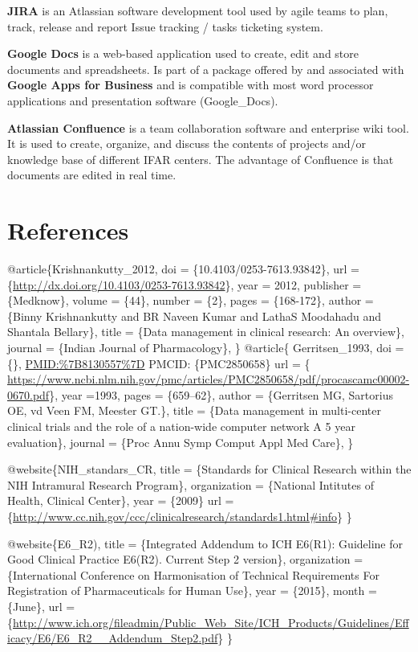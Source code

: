 \documentclass[]{book}
\theoremstyle{definition}
\theoremstyle{definition}
\theoremstyle{definition}
\theoremstyle{remark}
\begin{document}
\textbf{JIRA} is an Atlassian software development tool used by agile
teams to plan, track, release and report Issue tracking / tasks
ticketing system.

\textbf{Google Docs} is a web-based application used to create, edit and
store documents and spreadsheets. Is part of a package offered by and
associated with \textbf{Google Apps for Business} and is compatible with
most word processor applications and presentation software
(Google\_Docs).

\textbf{Atlassian Confluence} is a team collaboration software and
enterprise wiki tool. It is used to create, organize, and discuss the
contents of projects and/or knowledge base of different IFAR centers.
The advantage of Confluence is that documents are edited in real time.

\section{References}\label{references-1}

@article\{Krishnankutty\_2012, doi = \{10.4103/0253-7613.93842\}, url =
\{\url{http://dx.doi.org/10.4103/0253-7613.93842}\}, year = 2012,
publisher = \{Medknow\}, volume = \{44\}, number = \{2\}, pages =
\{168-172\}, author = \{Binny Krishnankutty and BR Naveen Kumar and
LathaS Moodahadu and Shantala Bellary\}, title = \{Data management in
clinical research: An overview\}, journal = \{Indian Journal of
Pharmacology\}, \} @article\{ Gerritsen\_1993, doi = \{\},
\url{PMID:\%7B8130557\%7D} PMCID: \{PMC2850658\} url = \{
\url{https://www.ncbi.nlm.nih.gov/pmc/articles/PMC2850658/pdf/procascamc00002-0670.pdf}\},
year =1993, pages = \{659--62\}, author = \{Gerritsen MG, Sartorius OE,
vd Veen FM, Meester GT.\}, title = \{Data management in multi-center
clinical trials and the role of a nation-wide computer network A 5 year
evaluation\}, journal = \{Proc Annu Symp Comput Appl Med Care\}, \}

@website\{NIH\_standars\_CR, title = \{Standards for Clinical Research
within the NIH Intramural Research Program\}, organization = \{National
Intitutes of Health, Clinical Center\}, year = \{2009\} url =
\{\url{http://www.cc.nih.gov/ccc/clinicalresearch/standards1.html\#info}\}
\}

@website\{E6\_R2), title = \{Integrated Addendum to ICH E6(R1):
Guideline for Good Clinical Practice E6(R2). Current Step 2 version\},
organization = \{International Conference on Harmonisation of Technical
Requirements For Registration of Pharmaceuticals for Human Use\}, year =
\{2015\}, month = \{June\}, url =
\{\url{http://www.ich.org/fileadmin/Public_Web_Site/ICH_Products/Guidelines/Efficacy/E6/E6_R2__Addendum_Step2.pdf}\}
\}
\end{document}
